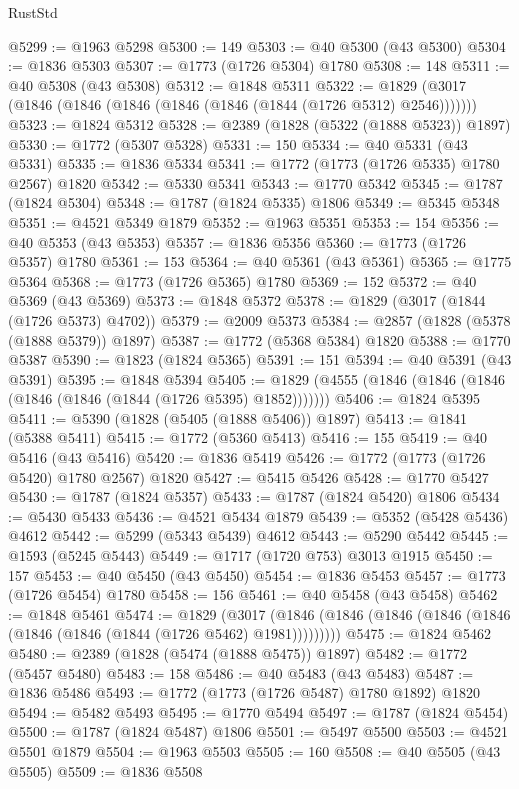 \begin{lexlean}{RustStd}
\begin{coremodule}
@5299 := @1963 @5298
@5300 := 149
@5303 := @40 @5300 (@43 @5300)
@5304 := @1836 @5303
@5307 := @1773 (@1726 @5304) @1780
@5308 := 148
@5311 := @40 @5308 (@43 @5308)
@5312 := @1848 @5311
@5322 := @1829 (@3017 (@1846 (@1846 (@1846 (@1846 (@1846 (@1844 (@1726 @5312) @2546)))))))
@5323 := @1824 @5312
@5328 := @2389 (@1828 (@5322 (@1888 @5323)) @1897)
@5330 := @1772 (@5307 @5328)
@5331 := 150
@5334 := @40 @5331 (@43 @5331)
@5335 := @1836 @5334
@5341 := @1772 (@1773 (@1726 @5335) @1780 @2567) @1820
@5342 := @5330 @5341
@5343 := @1770 @5342
@5345 := @1787 (@1824 @5304)
@5348 := @1787 (@1824 @5335) @1806
@5349 := @5345 @5348
@5351 := @4521 @5349 @1879
@5352 := @1963 @5351
@5353 := 154
@5356 := @40 @5353 (@43 @5353)
@5357 := @1836 @5356
@5360 := @1773 (@1726 @5357) @1780
@5361 := 153
@5364 := @40 @5361 (@43 @5361)
@5365 := @1775 @5364
@5368 := @1773 (@1726 @5365) @1780
@5369 := 152
@5372 := @40 @5369 (@43 @5369)
@5373 := @1848 @5372
@5378 := @1829 (@3017 (@1844 (@1726 @5373) @4702))
@5379 := @2009 @5373
@5384 := @2857 (@1828 (@5378 (@1888 @5379)) @1897)
@5387 := @1772 (@5368 @5384) @1820
@5388 := @1770 @5387
@5390 := @1823 (@1824 @5365)
@5391 := 151
@5394 := @40 @5391 (@43 @5391)
@5395 := @1848 @5394
@5405 := @1829 (@4555 (@1846 (@1846 (@1846 (@1846 (@1846 (@1844 (@1726 @5395) @1852)))))))
@5406 := @1824 @5395
@5411 := @5390 (@1828 (@5405 (@1888 @5406)) @1897)
@5413 := @1841 (@5388 @5411)
@5415 := @1772 (@5360 @5413)
@5416 := 155
@5419 := @40 @5416 (@43 @5416)
@5420 := @1836 @5419
@5426 := @1772 (@1773 (@1726 @5420) @1780 @2567) @1820
@5427 := @5415 @5426
@5428 := @1770 @5427
@5430 := @1787 (@1824 @5357)
@5433 := @1787 (@1824 @5420) @1806
@5434 := @5430 @5433
@5436 := @4521 @5434 @1879
@5439 := @5352 (@5428 @5436) @4612
@5442 := @5299 (@5343 @5439) @4612
@5443 := @5290 @5442
@5445 := @1593 (@5245 @5443)
@5449 := @1717 (@1720 @753) @3013 @1915
@5450 := 157
@5453 := @40 @5450 (@43 @5450)
@5454 := @1836 @5453
@5457 := @1773 (@1726 @5454) @1780
@5458 := 156
@5461 := @40 @5458 (@43 @5458)
@5462 := @1848 @5461
@5474 := @1829
    (@3017 (@1846 (@1846 (@1846 (@1846 (@1846 (@1846 (@1846 (@1844 (@1726 @5462) @1981)))))))))
@5475 := @1824 @5462
@5480 := @2389 (@1828 (@5474 (@1888 @5475)) @1897)
@5482 := @1772 (@5457 @5480)
@5483 := 158
@5486 := @40 @5483 (@43 @5483)
@5487 := @1836 @5486
@5493 := @1772 (@1773 (@1726 @5487) @1780 @1892) @1820
@5494 := @5482 @5493
@5495 := @1770 @5494
@5497 := @1787 (@1824 @5454)
@5500 := @1787 (@1824 @5487) @1806
@5501 := @5497 @5500
@5503 := @4521 @5501 @1879
@5504 := @1963 @5503
@5505 := 160
@5508 := @40 @5505 (@43 @5505)
@5509 := @1836 @5508

\end{coremodule}
\end{lexlean}

